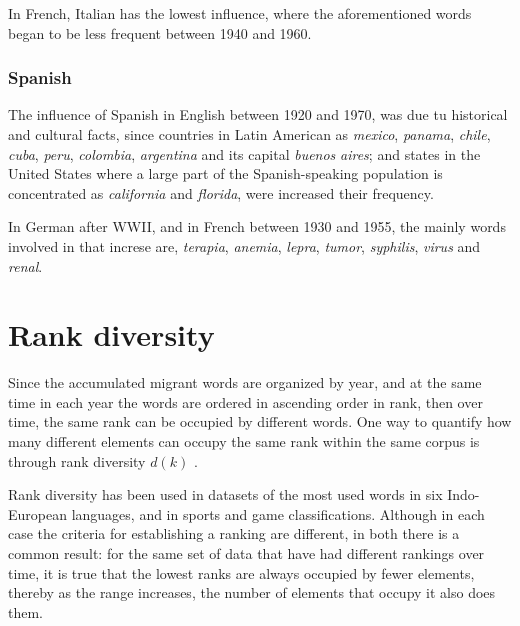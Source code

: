 \documentclass[10pt,letterpaper]{article} %
\begin{document}
	In French, Italian has the lowest influence, where the aforementioned words began to be less frequent between 1940 and 1960.
	\subsubsection*{Spanish} %
	
	The influence of Spanish in English between 1920 and 1970, was due tu historical and cultural facts, since countries in Latin American as  \textit{mexico}, \textit{panama}, \textit{chile}, \textit{cuba}, \textit{peru}, \textit{colombia}, \textit{argentina} and its capital \textit{buenos} \textit{aires};  and states in the United States  where a large part of the Spanish-speaking population is concentrated as \textit{california} and \textit{florida}, were increased their frequency.
	
	In German after WWII, and in French between 1930 and 1955, the mainly words involved in that increse are, \textit{terapia}, \textit{anemia}, \textit{lepra}, \textit{tumor}, \textit{syphilis}, \textit{virus} and \textit{renal}.
	
	\section*{Rank diversity} %
	
	Since the accumulated migrant words are organized by year, and at the same time
	in each year the words are ordered in ascending order in rank, then over time,
	the same rank can be occupied by different words. One way to quantify how many
	different elements can occupy the same rank within the same corpus is through
	rank diversity $d(k)$ .
	
	Rank diversity has been used in datasets of the most used words in six
	Indo-European languages, and in sports and game classifications. Although in
	each case the criteria for establishing a ranking are different, in both there
	is a common result: for the same set of data that have had different rankings
	over time, it is true that the lowest ranks are always occupied by fewer
	elements, thereby as the range increases, the number of elements that occupy it
	also does them.
	
\end{document}
